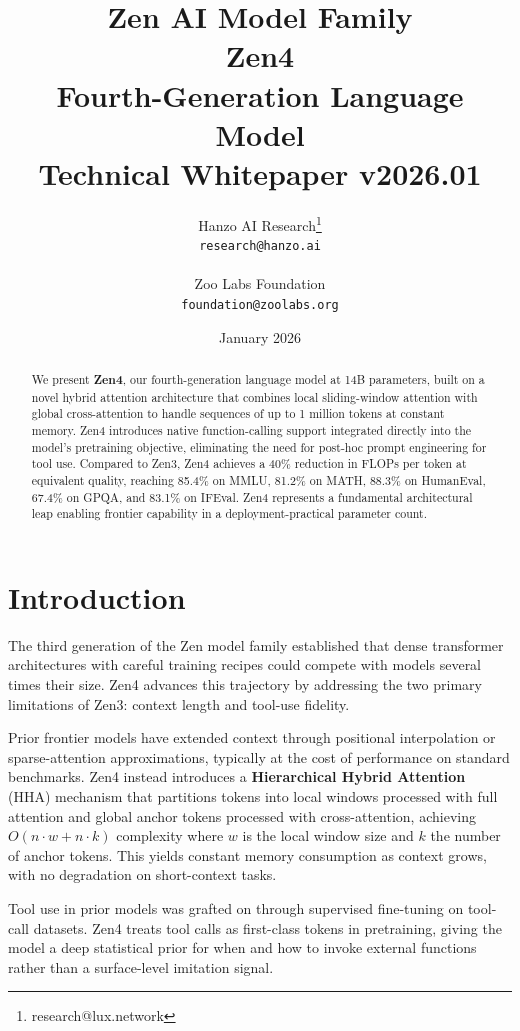 \documentclass[11pt,a4paper]{article}
\title{
    \vspace{-2cm}
    \Large \textbf{Zen AI Model Family} \\
    \vspace{0.5cm}
    \Huge \textbf{Zen4} \\
    \vspace{0.3cm}
    \large Fourth-Generation Language Model \\
    \vspace{0.5cm}
    \normalsize Technical Whitepaper v2026.01
}
\author{
    Hanzo AI Research\thanks{research@lux.network} \\
    \texttt{research@hanzo.ai} \\
    \\
    Zoo Labs Foundation \\
    \texttt{foundation@zoolabs.org}
}
\date{January 2026}
\begin{document}
\maketitle

\begin{abstract}
We present \textbf{Zen4}, our fourth-generation language model at 14B parameters, built on a novel hybrid
attention architecture that combines local sliding-window attention with global cross-attention to handle
sequences of up to 1 million tokens at constant memory. Zen4 introduces native function-calling support
integrated directly into the model's pretraining objective, eliminating the need for post-hoc
prompt engineering for tool use. Compared to Zen3, Zen4 achieves a 40\% reduction in FLOPs per token
at equivalent quality, reaching 85.4\% on MMLU, 81.2\% on MATH, 88.3\% on HumanEval, 67.4\% on GPQA,
and 83.1\% on IFEval. Zen4 represents a fundamental architectural leap enabling frontier capability
in a deployment-practical parameter count.
\end{abstract}

\tableofcontents
\newpage

\section{Introduction}

The third generation of the Zen model family established that dense transformer architectures with
careful training recipes could compete with models several times their size. Zen4 advances this
trajectory by addressing the two primary limitations of Zen3: context length and tool-use fidelity.

Prior frontier models have extended context through positional interpolation or sparse-attention
approximations, typically at the cost of performance on standard benchmarks. Zen4 instead introduces
a \textbf{Hierarchical Hybrid Attention} (HHA) mechanism that partitions tokens into local windows
processed with full attention and global anchor tokens processed with cross-attention, achieving
$O(n \cdot w + n \cdot k)$ complexity where $w$ is the local window size and $k$ the number of
anchor tokens. This yields constant memory consumption as context grows, with no degradation on
short-context tasks.

Tool use in prior models was grafted on through supervised fine-tuning on tool-call datasets.
Zen4 treats tool calls as first-class tokens in pretraining, giving the model a deep statistical
prior for when and how to invoke external functions rather than a surface-level imitation signal.
\end{document}
